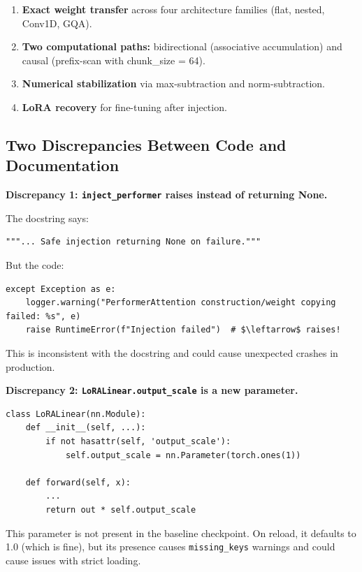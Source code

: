 \begin{enumerate}
\item \textbf{Exact weight transfer} across four architecture families (flat,
  nested, Conv1D, GQA).
\item \textbf{Two computational paths:} bidirectional (associative accumulation)
  and causal (prefix-scan with chunk\_size = 64).
\item \textbf{Numerical stabilization} via max-subtraction and norm-subtraction.
\item \textbf{LoRA recovery} for fine-tuning after injection.

\end{enumerate}
\subsection{Two Discrepancies Between Code and Documentation}

\textbf{Discrepancy 1: \texttt{inject\_performer} raises instead of returning None.}

The docstring says:

\begin{lstlisting}
"""... Safe injection returning None on failure."""
\end{lstlisting}

But the code:

\begin{lstlisting}
except Exception as e:
    logger.warning("PerformerAttention construction/weight copying failed: %s", e)
    raise RuntimeError(f"Injection failed")  # $\leftarrow$ raises!
\end{lstlisting}

This is inconsistent with the docstring and could cause unexpected crashes 
in production.

\textbf{Discrepancy 2: \texttt{LoRALinear.output\_scale} is a new parameter.}

\begin{lstlisting}
class LoRALinear(nn.Module):
    def __init__(self, ...):
        if not hasattr(self, 'output_scale'):
            self.output_scale = nn.Parameter(torch.ones(1))
    
    def forward(self, x):
        ...
        return out * self.output_scale
\end{lstlisting}

This parameter is not present in the baseline checkpoint. On reload, it 
defaults to 1.0 (which is fine), but its presence causes \texttt{missing\_keys} 
warnings and could cause issues with strict loading.

